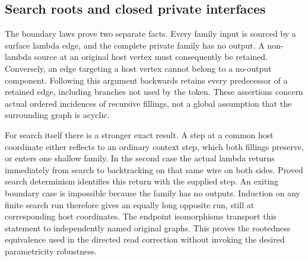 \subsection{Search roots and closed private interfaces}
The boundary laws prove two separate facts. Every family input is sourced
by a surface lambda edge, and the complete private family has no output.
A non-lambda source at an original host vertex must consequently be
retained. Conversely, an edge targeting a host vertex cannot belong to a
no-output component. Following this argument backwards retains every
predecessor of a retained edge, including branches not used by the token.
These assertions concern actual ordered incidences of recursive fillings,
not a global assumption that the surrounding graph is acyclic.

For search itself there is a stronger exact result. A step at a common
host coordinate either reflects to an ordinary context step, which both
fillings preserve, or enters one shallow family. In the second case the
actual lambda returns immediately from search to backtracking on that same
wire on both sides. Proved search determinism identifies this return with
the supplied step. An exiting boundary case is impossible because the
family has no outputs. Induction on any finite search run therefore gives
an equally long opposite run, still at corresponding host coordinates.
The endpoint isomorphisms transport this statement to independently named
original graphs. This proves the rootedness equivalence used in the directed
read correction without invoking the desired parametricity robustness.

\par{}
\par{}
\par{}
\par{}
\par{}
\par{}

